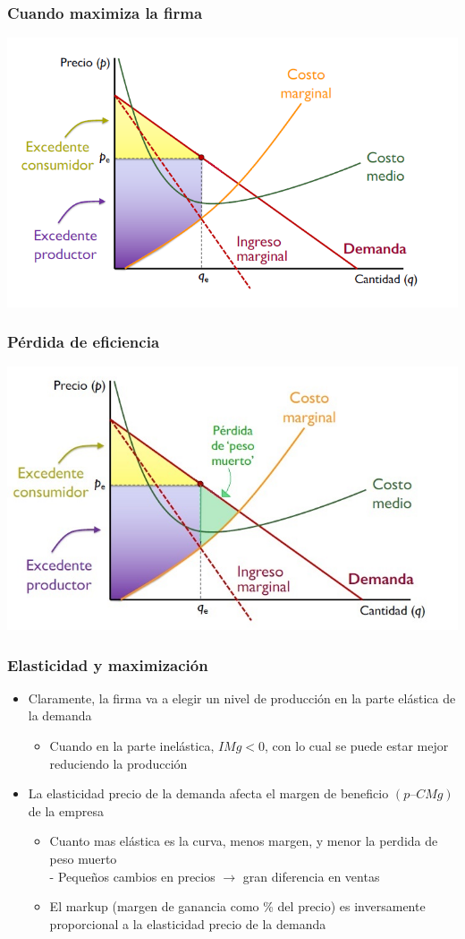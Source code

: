 \documentclass{beamer}
\begin{document}
\begin{frame}
\frametitle{Cuando maximiza la firma}
\includegraphics[scale=0.6]{Figures/Tema_06.41_excedente4.png}
\end{frame}

\begin{frame}
\frametitle{ Pérdida de eficiencia}
\includegraphics[scale=0.6]{Figures/Tema_06.42_excedente5.jpg}
\end{frame}

\begin{frame}
\frametitle{ Elasticidad y maximización}
\begin{itemize}
    \item Claramente, la firma va a elegir un nivel de producción en la parte elástica de la demanda
    \begin{itemize}
        \item Cuando en la parte inelástica, $IMg < 0$, con lo cual se puede estar mejor reduciendo la producción
    \end{itemize}
    \item La elasticidad precio de la demanda afecta el margen de beneficio $(p – CMg)$ de la empresa
    \begin{itemize}
        \item Cuanto mas elástica es la curva, menos margen, y menor la perdida de peso muerto \\
        - Pequeños cambios en precios $\rightarrow$ gran diferencia en ventas
        \item El markup (margen de ganancia como \% del precio) es inversamente proporcional a la elasticidad precio de la demanda
    \end{itemize}
\end{itemize}
\end{frame}
\end{document}
